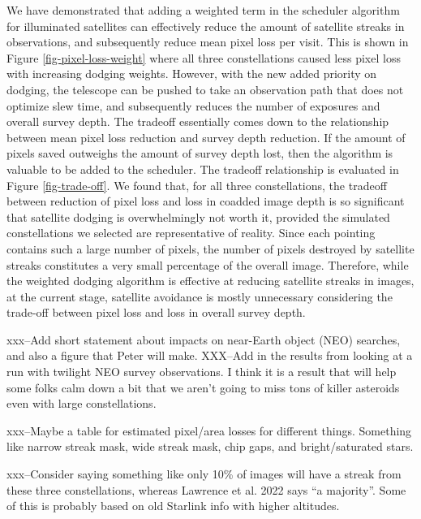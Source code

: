 \documentclass[linenumbers]{aastex631}
\begin{document}
We have demonstrated that adding a weighted term in the scheduler algorithm for illuminated satellites can effectively reduce the amount of satellite streaks in observations, and subsequently reduce mean pixel loss per visit. This is shown in Figure \ref{fig-pixel-loss-weight} where all three constellations caused less pixel loss with increasing dodging weights. However, with the new added priority on dodging, the telescope can be pushed to take an observation path that does not optimize slew time, and subsequently reduces the number of exposures and overall survey depth. The tradeoff essentially comes down to the relationship between mean pixel loss reduction and survey depth reduction. If the amount of pixels saved outweighs the amount of survey depth lost, then the algorithm is valuable to be added to the scheduler. The tradeoff relationship is evaluated in Figure \ref{fig-trade-off}. We found that, for all three constellations, the tradeoff between reduction of pixel loss and loss in coadded image depth is so significant that satellite dodging is overwhelmingly not worth it, provided the simulated constellations we selected are representative of reality. Since each pointing contains such a large number of pixels, the number of pixels destroyed by satellite streaks constitutes a very small percentage of the overall image. Therefore, while the weighted dodging algorithm is effective at reducing satellite streaks in images, at the current stage, satellite avoidance is mostly unnecessary considering the trade-off between pixel loss and loss in overall survey depth.

xxx--Add short statement about impacts on near-Earth object (NEO) searches, and also a figure that Peter will make.
XXX--Add in the results from looking at a run with twilight NEO survey observations. I think it is a result that will help some folks calm down a bit that we aren't going to miss tons of killer asteroids even with large constellations.

xxx--Maybe a table for estimated pixel/area losses for different things. Something like narrow streak mask, wide streak mask, chip gaps, and bright/saturated stars. 

xxx--Consider saying something like only 10\% of images will have a streak from these three constellations, whereas Lawrence et al. 2022 says ``a majority''. Some of this is probably based on old Starlink info with higher altitudes.
\end{document}
